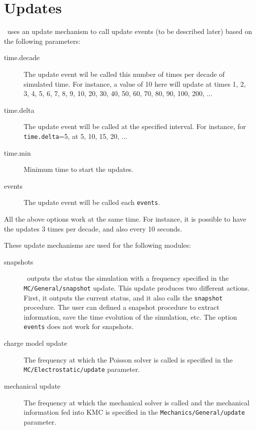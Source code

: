 \section{Updates}

\MMonCa\ uses an update mechanism to call update events (to be described later) based on the following parameters:
\begin{description}
\item[time.decade] The update event wil be called this number of times per decade of simulated time. For instance, a value of 10 here will update at times 1, 2, 3, 4, 5, 6, 7, 8, 9, 10, 20, 30, 40, 50, 60, 70, 80, 90, 100, 200, ...
\item[time.delta] The update event will be called at the specified interval. For instance, for {\tt time.delta}=5, at 5, 10, 15, 20, ...
\item[time.min] Minimum time to start the updates.
\item[events] The update event will be called each {\tt events}.
\end{description}

All the above options work at the same time. For instance, it is possible to have the updates 3 times per decade, and also every 10 seconds.

These update mechanisms are used for the following modules:

\begin{description}
\item[snapshots] \MMonCa\ outputs the status the simulation with a frequency specified in the {\tt MC/General/snapshot} update. This update produces two different actions. First, it outputs the current status, and it also calls the {\tt snapshot} procedure. The user can defined a snapshot procedure to extract information, save the time evolution of the simulation, etc. The option {\tt events} does not work for snapshots.
\item[charge model update] The frequency at which the Poisson solver is called is specified in the {\tt MC/Electrostatic/update} parameter.
\item[mechanical update] The frequency at which the mechanical solver is called and the mechanical information fed into KMC is specified in the {\tt Mechanics/General/update} parameter.
\end{description}



